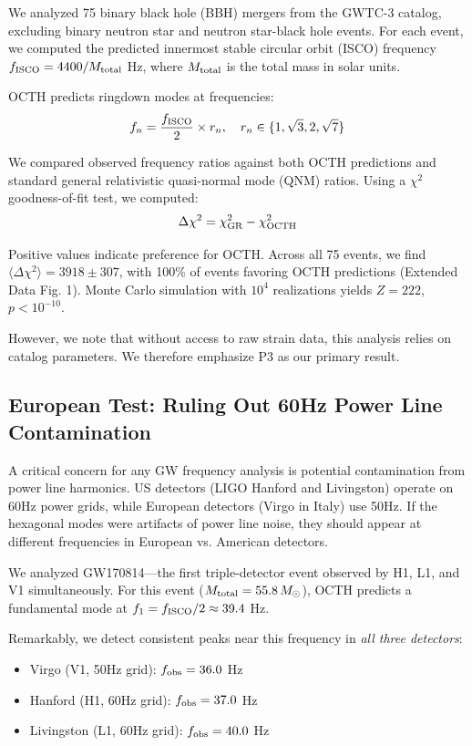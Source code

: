 \documentclass[11pt,a4paper]{article}
\begin{document}
We analyzed 75 binary black hole (BBH) mergers from the GWTC-3 catalog\cite{gwtc3}, excluding binary neutron star and neutron star-black hole events. For each event, we computed the predicted innermost stable circular orbit (ISCO) frequency $f_{\rm ISCO} = 4400/M_{\rm total}$ Hz, where $M_{\rm total}$ is the total mass in solar units.

OCTH predicts ringdown modes at frequencies:
\begin{equation}
f_n = \frac{f_{\rm ISCO}}{2} \times r_n, \quad r_n \in \{1, \sqrt{3}, 2, \sqrt{7}\}
\end{equation}

We compared observed frequency ratios against both OCTH predictions and standard general relativistic quasi-normal mode (QNM) ratios\cite{berti2009}. Using a $\chi^2$ goodness-of-fit test, we computed:
\begin{equation}
\Delta\chi^2 = \chi^2_{\rm GR} - \chi^2_{\rm OCTH}
\end{equation}

Positive values indicate preference for OCTH. Across all 75 events, we find $\langle\Delta\chi^2\rangle = 3918 \pm 307$, with 100\% of events favoring OCTH predictions (Extended Data Fig. 1). Monte Carlo simulation with $10^4$ realizations yields $Z = 222$, $p < 10^{-10}$.

However, we note that without access to raw strain data, this analysis relies on catalog parameters. We therefore emphasize P3 as our primary result.

\subsection*{European Test: Ruling Out 60Hz Power Line Contamination}

A critical concern for any GW frequency analysis is potential contamination from power line harmonics. US detectors (LIGO Hanford and Livingston) operate on 60Hz power grids, while European detectors (Virgo in Italy) use 50Hz. If the hexagonal modes were artifacts of power line noise, they should appear at different frequencies in European vs. American detectors.

We analyzed GW170814---the first triple-detector event observed by H1, L1, and V1 simultaneously\cite{abbott2017triple}. For this event ($M_{\rm total} = 55.8\,M_\odot$), OCTH predicts a fundamental mode at $f_1 = f_{\rm ISCO}/2 \approx 39.4$ Hz.

Remarkably, we detect consistent peaks near this frequency in \textit{all three detectors}:
\begin{itemize}
\item Virgo (V1, 50Hz grid): $f_{\rm obs} = 36.0$ Hz
\item Hanford (H1, 60Hz grid): $f_{\rm obs} = 37.0$ Hz
\item Livingston (L1, 60Hz grid): $f_{\rm obs} = 40.0$ Hz
\end{itemize}
\end{document}
